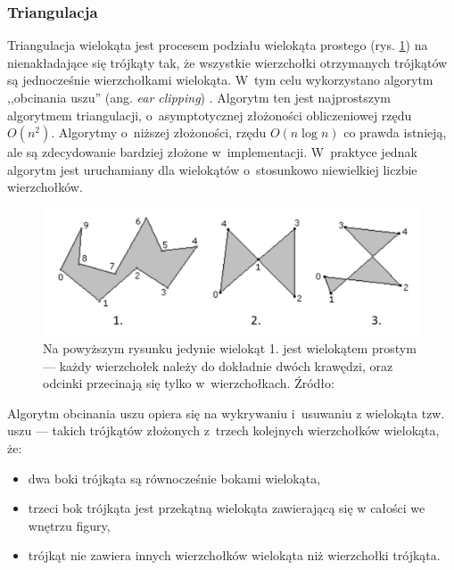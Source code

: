 \clearpage


\subsubsection{Triangulacja}
\label{part:triangulacja}
Triangulacja wielokąta jest procesem podziału wielokąta prostego (rys. \ref{fig:triangulacja-wielokatprosty}) na nienakładające się trójkąty tak, że wszystkie wierzchołki otrzymanych trójkątów są jednocześnie wierzchołkami wielokąta. W~tym celu wykorzystano algorytm ,,obcinania uszu'' (ang. \textit{ear clipping}) \cite{bib:eberlytriangulation}. Algorytm ten jest najprostszym algorytmem triangulacji, o~asymptotycznej złożoności obliczeniowej rzędu $O(n^2)$. Algorytmy o~niższej złożoności, rzędu $O(n \log n)$ co prawda istnieją, ale są zdecydowanie bardziej złożone w~implementacji. W~praktyce jednak algorytm jest uruchamiany dla wielokątów o~stosunkowo niewielkiej liczbie wierzchołków.
\begin{figure}[ht]
	\centering
	\includegraphics[width=0.8\linewidth]{images/triangulacja-wielokatprosty}
	\caption[Przykład wielokąta prostego]{Na powyższym rysunku jedynie wielokąt 1. jest wielokątem prostym --- każdy wierzchołek należy do dokładnie dwóch krawędzi, oraz odcinki przecinają się tylko w~wierzchołkach. Źródło: \cite{bib:eberlytriangulation}}
	\label{fig:triangulacja-wielokatprosty}
\end{figure}

Algorytm obcinania uszu opiera się na wykrywaniu i~usuwaniu z wielokąta tzw. uszu --- takich trójkątów złożonych z~trzech kolejnych wierzchołków wielokąta, że:
\begin{itemize}
	\item dwa boki trójkąta są równocześnie bokami wielokąta,
	\item trzeci bok trójkąta jest przekątną wielokąta zawierającą się w całości we wnętrzu figury,
	\item trójkąt nie zawiera innych wierzchołków wielokąta niż wierzchołki trójkąta.
\end{itemize}

